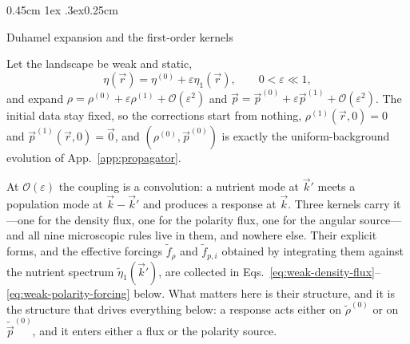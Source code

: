 \documentclass[
  reprint,
  superscriptaddress,
  amsmath,
  amssymb,
  aps,
  pre,
  nofootinbib,
  floatfix
]{revtex4-2}
\makeatletter
\newcommand{\rv}{\vec r}
\newcommand{\pv}{\vec p}
\newcommand{\ord}{\mathcal O}
\def\subsection{\@startsection{subsection}{2}{\z@}%
  {0.45cm \@plus1ex \@minus.3ex}{0.25cm}%
  {\normalfont\small\bfseries\raggedright}}%
\makeatother
\begin{document}
\subsection{Duhamel expansion and the first-order kernels}

Let the landscape be weak and static,
\begin{equation}
 \eta(\rv) = \eta^{(0)} + \varepsilon \eta_1(\rv), \qquad 0 < \varepsilon \ll 1,
 \label{eq:weak-nutrient-field}
\end{equation}
and expand $\rho=\rho^{(0)}+\varepsilon\rho^{(1)}+\ord(\varepsilon^2)$ and
$\pv=\pv^{(0)}+\varepsilon\pv^{(1)}+\ord(\varepsilon^2)$.  The initial data
stay fixed, so the corrections start from nothing,
$\rho^{(1)}(\rv,0)=0$ and $\pv^{(1)}(\rv,0)=\vec0$, and $(\rho^{(0)},\pv^{(0)})$
is exactly the uniform-background evolution of App.~\ref{app:propagator}.

At $\ord(\varepsilon)$ the coupling is a convolution: a nutrient mode at
$\vec k'$ meets a population mode at $\vec k-\vec k'$ and produces a response
at $\vec k$.  Three kernels carry it---one for the density flux, one for the
polarity flux, one for the angular source---and all nine microscopic rules
live in them, and nowhere else.  Their explicit forms, and the effective
forcings $\tilde f_\rho$ and $\tilde f_{p,i}$ obtained by integrating them
against the nutrient spectrum $\tilde\eta_1(\vec k')$, are collected in
Eqs.~\eqref{eq:weak-density-flux}--\eqref{eq:weak-polarity-forcing} below.
What matters here is their structure, and it is the structure that drives
everything below: a response acts either on $\tilde\rho^{(0)}$ or on
$\tilde\pv^{(0)}$, and it enters either a flux or the polarity source.
\end{document}

